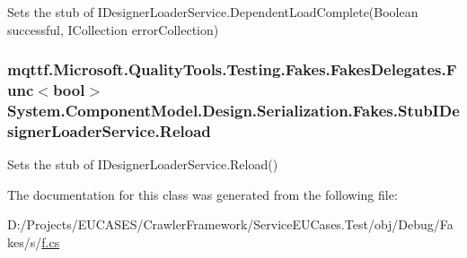 Sets the stub of I\-Designer\-Loader\-Service.\-Dependent\-Load\-Complete(\-Boolean successful, I\-Collection error\-Collection)

\hypertarget{class_system_1_1_component_model_1_1_design_1_1_serialization_1_1_fakes_1_1_stub_i_designer_loader_service_a908851278e71e5c7beff6364ce962e18}{
\subsubsection[{Reload}]{\setlength{\rightskip}{0pt plus 5cm}mqttf.\-Microsoft.\-Quality\-Tools.\-Testing.\-Fakes.\-Fakes\-Delegates.\-Func$<$bool$>$ System.\-Component\-Model.\-Design.\-Serialization.\-Fakes.\-Stub\-I\-Designer\-Loader\-Service.\-Reload}}\label{class_system_1_1_component_model_1_1_design_1_1_serialization_1_1_fakes_1_1_stub_i_designer_loader_service_a908851278e71e5c7beff6364ce962e18}


Sets the stub of I\-Designer\-Loader\-Service.\-Reload()



The documentation for this class was generated from the following file\-:\begin{DoxyCompactItemize}
\item 
D\-:/\-Projects/\-E\-U\-C\-A\-S\-E\-S/\-Crawler\-Framework/\-Service\-E\-U\-Cases.\-Test/obj/\-Debug/\-Fakes/s/\hyperlink{s_2f_8cs}{f.\-cs}\end{DoxyCompactItemize}
